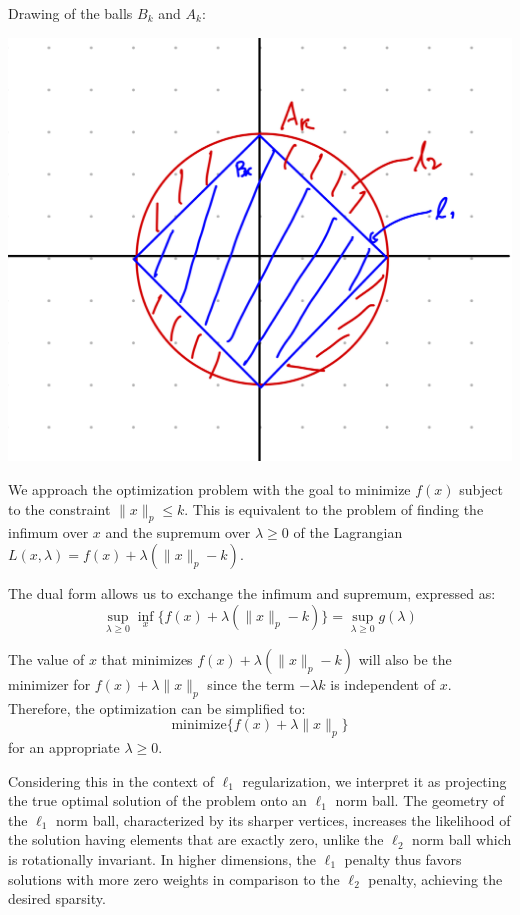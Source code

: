 \documentclass[12pt,letterpaper,fleqn]{hmcpset}
\begin{document}
\begin{solution}
Drawing of the balls $B_k$ and $A_k$:
\begin{center}
	\includegraphics[scale=0.2]{ball.png}
\end{center}

We approach the optimization problem with the goal to minimize $f(x)$ subject to the constraint $\|x\|_p \leq k$. This is equivalent to the problem of finding the infimum over $x$ and the supremum over $\lambda \geq 0$ of the Lagrangian $L(x, \lambda) = f(x) + \lambda(\|x\|_p - k)$.

The dual form allows us to exchange the infimum and supremum, expressed as:
\[
\sup_{\lambda \geq 0} \inf_x \{ f(x) + \lambda(\|x\|_p - k) \} = \sup_{\lambda \geq 0} g(\lambda)
\]

The value of $x$ that minimizes $f(x) + \lambda(\|x\|_p - k)$ will also be the minimizer for $f(x) + \lambda\|x\|_p$ since the term $-\lambda k$ is independent of $x$. Therefore, the optimization can be simplified to:
\[
\text{minimize} \{ f(x) + \lambda\|x\|_p \}
\]
for an appropriate $\lambda \geq 0$.

Considering this in the context of $\ell_1$ regularization, we interpret it as projecting the true optimal solution of the problem onto an $\ell_1$ norm ball. The geometry of the $\ell_1$ norm ball, characterized by its sharper vertices, increases the likelihood of the solution having elements that are exactly zero, unlike the $\ell_2$ norm ball which is rotationally invariant. In higher dimensions, the $\ell_1$ penalty thus favors solutions with more zero weights in comparison to the $\ell_2$ penalty, achieving the desired sparsity.

\end{solution}
\newpage
\end{document}
